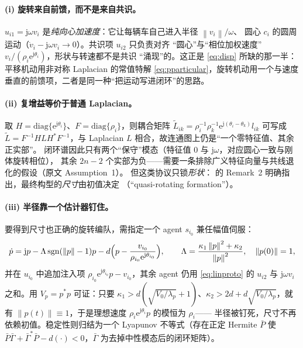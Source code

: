 \documentclass[11pt,a4paper]{ctexart}
\theoremstyle{plain}
\theoremstyle{definition}
\theoremstyle{remark}
\newcommand{\norm}[1]{\left\|#1\right\|}
\DeclareMathOperator{\sgn}{sgn}
\begin{document}
\paragraph{(i) 旋转来自前馈，而不是来自共识。}
$u_{i1}=\mathrm j\omega v_i$ 是\emph{纯向心加速度}：它让每辆车自己进入半径 $\norm{v_i}/\omega$、
圆心 $c_i$ 的圆周运动（$\dot v_i-\mathrm j\omega v_i\to0$）。共识项 $u_{i2}$ 只负责对齐
“圆心”与“相位加权速度” $v_i/(\rho_i\mathrm e^{\mathrm j\theta_i})$，形状与转速都不是共识
“涌现”的。这正是 \eqref{eq:disp} 所缺的那一半：平移机动用非对称 Laplacian 的常值特解
\eqref{eq:pparticular}，旋转机动用一个与速度垂直的前馈项，二者是同一种“把运动写进闭环”的思路。

\paragraph{(ii) 复增益等价于普通 Laplacian。}
取 $H=\mathrm{diag}\{\mathrm e^{\mathrm j\theta_i}\}$、$F=\mathrm{diag}\{\rho_i\}$，则耦合矩阵
$\tilde L_{ik}=\rho_i^{-1}\rho_k^{-1}\mathrm e^{\mathrm j(\theta_i-\theta_k)}l_{ik}$ 可写成
$\tilde L=F^{-1}HLH^{*}F^{-1}$，与 Laplacian $L$ 相合，故连通图上仍是“一个零特征值、其余正实部”。
闭环谱因此只有两个“保守”模态（特征值 $0$ 与 $\mathrm j\omega$，对应圆心一致与刚体旋转相位），
其余 $2n-2$ 个实部为负——需要一条排除广义特征向量与共线退化的假设（原文 Assumption~1）。
但这类协议只锁\emph{形状}：\cite{lin2010} 的 Remark~2 明确指出，最终构型的\emph{尺寸}由初值决定
（“quasi-rotating formation”）。

\paragraph{(iii) 半径靠一个估计器钉住。}
要得到尺寸也正确的旋转编队，需指定一个 agent $s_{i_0}$ 兼任幅值伺服：
\begin{equation}
  \dot p=\mathrm j p-\Lambda\sgn(\norm p-1)p
        -d\Bigl(p-\frac{v_{i_0}}{\rho_{i_0}\mathrm e^{\mathrm j\theta_{i_0}}}\Bigr),
  \qquad
  \Lambda=\frac{\kappa_1\norm p^2+\kappa_2}{\norm p^2},\quad \norm{p(0)}=1,
  \label{eq:linleader}
\end{equation}
并在 $u_{i_0}$ 中追加注入项 $\rho_{i_0}\mathrm e^{\mathrm j\theta_{i_0}}p-v_{i_0}$，其余 agent 仍用
\eqref{eq:linproto} 的 $u_{i2}$ 与 $\mathrm j\omega v_i$ 之和。用 $V_p=p^{*}p$ 可证：只要
$\kappa_1>d(\sqrt{V_0/\lambda_p}+1)$、$\kappa_2>2d+d\sqrt{V_0/\lambda_p}$，就有
$\norm{p(t)}\equiv1$，于是理想速度 $\rho_i\mathrm e^{\mathrm j\theta_i}p$ 的模恒为 $\rho_i$——
半径被钉死，尺寸不再依赖初值。稳定性则归结为一个 Lyapunov 不等式（存在正定 Hermite $\bar P$ 使
$\bar P\bar\Gamma+\bar\Gamma^{*}\bar P-d(\cdot)<0$，$\bar\Gamma$ 为去掉中性模态后的闭环矩阵）。
\end{document}
